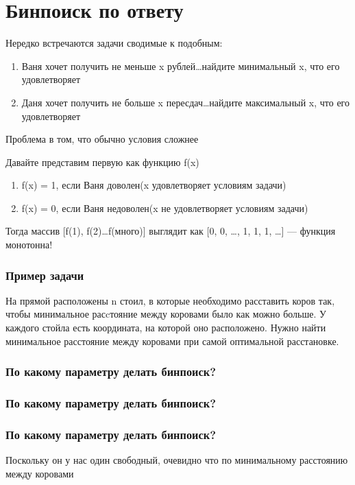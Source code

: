 \section{Бинпоиск по ответу}

\begin{frame}
    Нередко встречаются задачи сводимые к подобным:
    \begin{enumerate}
        \item Ваня хочет получить не меньше x рублей\dots найдите минимальный x, что его удовлетворяет
        \item Даня хочет получить не больше x пересдач\dots найдите максимальный x, что его удовлетворяет
    \end{enumerate}
    Проблема в том, что обычно условия сложнее
\end{frame}

\begin{frame}
    Давайте представим первую как функцию f(x)
    \begin{enumerate}
        \item f(x) = 1, если Ваня доволен(x удовлетворяет условиям задачи)
        \item f(x) = 0, если Ваня недоволен(x не удовлетворяет условиям задачи)
    \end{enumerate}
    Тогда массив [f(1), f(2)\dots f(много)] выглядит как [0, 0, \dots, 1, 1, 1, \dots] --- функция монотонна!
\end{frame}

\begin{frame}
    \frametitle{Пример задачи}
    На прямой расположены n стоил, в которые необходимо расставить коров так, чтобы минимальное расcтояние между коровами было как можно больше. У каждого стойла есть координата, на которой оно расположено. Нужно найти минимальное расстояние между коровами при самой оптимальной расстановке.
\end{frame}

\begin{frame}
    \frametitle{По какому параметру делать бинпоиск?}
\end{frame}

\begin{frame}
    \frametitle{По какому параметру делать бинпоиск?}
\end{frame}

\begin{frame}
    \frametitle{По какому параметру делать бинпоиск?}
    Поскольку он у нас один свободный, очевидно что по минимальному расстоянию между коровами
\end{frame}

